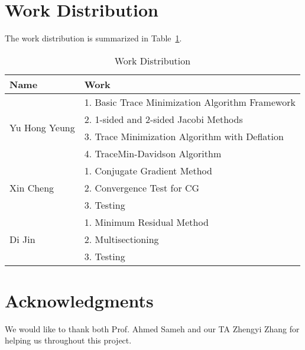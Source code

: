 \documentclass[10pt]{SelfArx} %
\begin{document}
\section{Work Distribution}
The work distribution is summarized in Table~\ref{tab:work}.
\begin{table}[!hbt]
	\caption{Work Distribution}
	\centering
	\begin{tabularx}{0.5\textwidth}{lX}
		\toprule
		Name & Work\\
		\midrule
		\multirow{4}{*}{Yu Hong Yeung} & 1. Basic Trace Minimization Algorithm Framework\\
																	 & 2. 1-sided and 2-sided Jacobi Methods\\
															 		 & 3. Trace Minimization Algorithm with Deflation\\
																	 & 4. TraceMin-Davidson Algorithm\\
		\midrule
		\multirow{3}{*}{Xin Cheng} & 1. Conjugate Gradient Method\\
													 		 & 2. Convergence Test for CG\\
															 & 3. Testing\\
		\midrule
		\multirow{3}{*}{Di Jin} & 1. Minimum Residual Method\\
														& 2. Multisectioning\\
														& 3. Testing\\
		\bottomrule
	\end{tabularx}
	\label{tab:work}
\end{table}


\section*{Acknowledgments} %

We would like to thank both Prof. Ahmed Sameh and our TA Zhengyi Zhang for helping us throughout this project.


\nocite{*}



\end{document}
